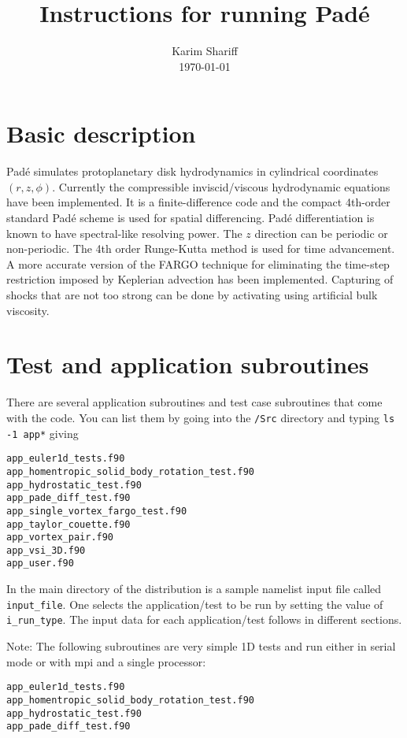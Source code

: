\documentclass[11pt]{amsart}
\title{Instructions for running {\sc Pad\'e}}
\author{Karim Shariff \\ \today}
\begin{document}
\maketitle

\section{Basic description}
{\sc Pad\'e} simulates protoplanetary disk hydrodynamics in cylindrical coordinates
$(r, z, \phi)$.  Currently the compressible inviscid/viscous hydrodynamic equations have been implemented.
It is a finite-difference code and the compact 4th-order standard Pad\'e scheme is used for spatial differencing.  
Pad\'e differentiation is known to have spectral-like resolving power.  The $z$ direction can be periodic or
non-periodic.  The 4th order Runge-Kutta method is used for time advancement.  
A more accurate version of the FARGO technique for eliminating the time-step restriction imposed by Keplerian advection has been implemented.  Capturing of shocks that are not too strong can be done by activating using artificial bulk viscosity.

\section{Test and application subroutines}

There are several application subroutines and test case subroutines that come with the code.  You can list them by going into the {\tt /Src} directory and typing {\tt ls -1 app*} giving

\begin{verbatim}
app_euler1d_tests.f90
app_homentropic_solid_body_rotation_test.f90
app_hydrostatic_test.f90
app_pade_diff_test.f90
app_single_vortex_fargo_test.f90
app_taylor_couette.f90
app_vortex_pair.f90
app_vsi_3D.f90
app_user.f90
\end{verbatim}

In the main directory of the distribution is a sample namelist input file called {\tt input\_file}.  One selects the application/test to be run by setting the value of {\tt i\_run\_type}.  The input data for each application/test follows in different sections.

Note: The following subroutines are very simple 1D tests and run either in serial mode or with mpi and a single processor:
\begin{verbatim}
app_euler1d_tests.f90
app_homentropic_solid_body_rotation_test.f90
app_hydrostatic_test.f90
app_pade_diff_test.f90
\end{verbatim}
\end{document}
